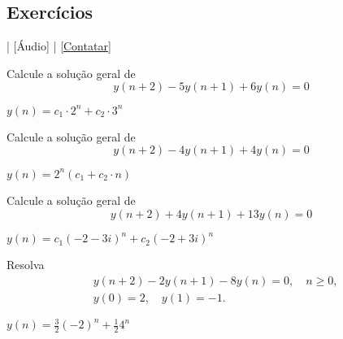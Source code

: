 \subsection*{Exercícios}

\begin{flushright}
  [Vídeo] | [Áudio] | \href{https://phkonzen.github.io/notas/contato.html}{[Contatar]}
\end{flushright}

\begin{exer}
  Calcule a solução geral de
  \begin{equation}
    y(n+2) - 5y(n+1) + 6y(n) = 0
  \end{equation}
\end{exer}
\begin{resp}
  $y(n) = c_1\cdot 2^n + c_2\cdot 3^n$
\end{resp}

\begin{exer}
  Calcule a solução geral de
  \begin{equation}
    y(n+2) - 4y(n+1) + 4y(n) = 0
  \end{equation}
\end{exer}
\begin{resp}
  $y(n) = 2^n(c_1 + c_2\cdot n)$
\end{resp}

\begin{exer}
  Calcule a solução geral de
  \begin{equation}
    y(n+2) + 4y(n+1) + 13y(n) = 0
  \end{equation}
\end{exer}
\begin{resp}
  $y(n) = c_1(-2-3i)^n + c_2(-2+3i)^n$
\end{resp}

\begin{exer}
  Resolva
  \begin{align}
    &y(n+2) - 2y(n+1) - 8y(n) = 0,\quad n\geq 0,\\
    &y(0)=2,\quad y(1)=-1.
  \end{align}
\end{exer}
\begin{resp}
  $y(n) = \frac{3}{2}(-2)^n + \frac{1}{2}4^n$
\end{resp}
